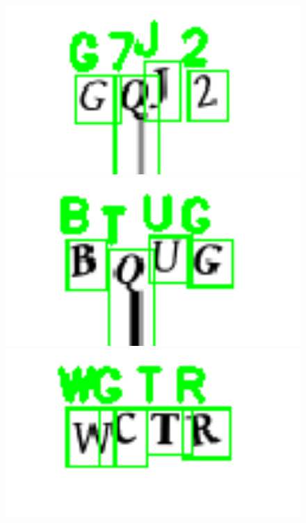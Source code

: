\begin{figure}
	\centering
	\begin{minipage}{0.23\textwidth}
		\centering
		\includegraphics[width=1\textwidth]{wronglabel_1.png}
	\end{minipage}
	\begin{minipage}{0.23\textwidth}
		\centering
		\includegraphics[width=1\textwidth]{wronglabel_2.png} 
		
	\end{minipage}
	\begin{minipage}{0.23\textwidth}
		\centering
		\includegraphics[width=1\textwidth]{wronglabel_3.png} 
		

\end{minipage}
\end{figure}
